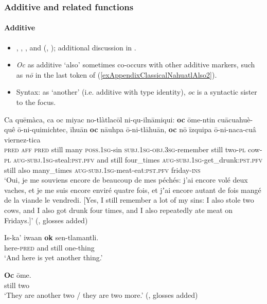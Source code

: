 \subsubsection{Additive and related functions}
\paragraph{Additive}\label{appendixClassicalNahuatlAdditive}
\begin{itemize}
	\item \textcite[43–44, 318, 548–549]{Andrews2003}, \textcite[247]{Bierhorst1985}, \textcite[502]{Carochi1645}, \textcite[175–176]{Karttunen1992} and \citeauthor{Launey1986} (\citeyear[1265–1267, 1425]{Launey1986}, \citeyear[66]{LauneyMackay2011}); additional discussion in \textcite[308–309]{vanBaar1997}.
	\item \textit{Oc} as additive \lq also\rq{ }sometimes co-occurs with other additive markers, such as \textit{nō} in the last token of (\ref{exAppendixClassicalNahuatlAlso2}).
	\item Syntax: as \lq another\rq{ }(i.e. additive with type identity), \textit{oc} is a syntactic sister to the focus.
\end{itemize}
\begin{exe}
	\ex\label{exAppendixClassicalNahuatlAlso2}
	\gll Ca quēmàca, ca oc miyac no-tlàtlacōl ni-qu-ilnāmiqui: \textbf{oc} ōme-ntin cuācuahuè-quê ō-ni-quimichtec, īhuān \textbf{oc} nāuhpa ō-ni-tlāhuān, \textbf{oc} nō īzquipa ō-ni-naca-cuâ viernez-tica\\
	\textsc{pred} \textsc{aff} \textsc{pred} still many \textsc{poss}.1\textsc{sg}-sin \textsc{subj}.1\textsc{sg}-\textsc{obj}.3\textsc{sg}-remember still two-\textsc{pl} cow-\textsc{pl} \textsc{aug}-\textsc{subj}.1\textsc{sg}-steal:\textsc{pst}.\textsc{pfv} and still four\_times \textsc{aug}-\textsc{subj}.1\textsc{sg}-get\_drunk:\textsc{pst}.\textsc{pfv} still also many\_times \textsc{aug}-\textsc{subj}.1\textsc{sg}-meat-eat:\textsc{pst}.\textsc{pfv} friday-\textsc{ins}\\
	\glt \lq Oui, je me souviens encore de beaucoup de mes péchés: j’ai encore volé deux vaches, et je me suis encore enviré quatre fois, et jʼai encore autant de fois mangé de la viande le vendredi.
[Yes, I still remember a lot of my sins: I also stole two cows, and I also got drunk four times, and I also repeatedly ate meat on Fridays.]\rq{ }(\cite[1266]{Launey1986}, glosses added)

	\ex
	\gll Is-ka' iwaan \textbf{ok} sen-tlamantli.\\
	here-\textsc{pred} and still one-thing\\
	\glt \lq And here is yet another thing.' \parencite[41]{Langacker1977}

	\ex \gll \textbf{Oc} ōme.\\
	still two\\
	\glt \lq They are another two / they are two more.' (\cite[318]{Andrews2003}, glosses added)
\end{exe}




